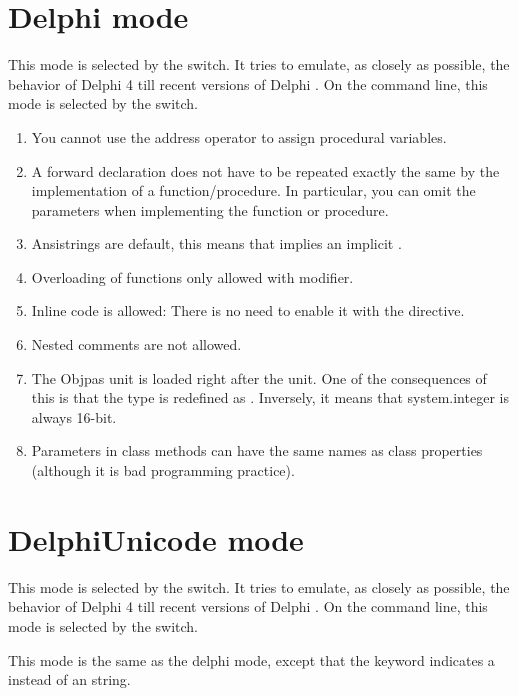 \section{Delphi mode}
This mode is selected by the  switch. It tries to emulate,
as closely as possible, the behavior of Delphi 4 till recent versions of Delphi . 
On the command line, this mode is selected by the  switch.
\begin{enumerate}
\item You cannot use the address operator to assign procedural variables.
\item A forward declaration does not have to be repeated exactly the same by the
implementation of a function/procedure. In particular, you can omit the
parameters when implementing the function or procedure.
\item Ansistrings are default, this means that  implies
an implicit .
\item Overloading of functions only allowed with  modifier.
\item Inline code is allowed: There is no need to enable it with the 
directive.
\item Nested comments are not  allowed.
\item The Objpas unit is loaded right after the  unit. One of the
consequences of this is that the type  is redefined as
. Inversely, it means that system.integer is always 16-bit.
\item Parameters in class methods can have the same names as class
properties (although it is bad programming practice).
\end{enumerate}

\section{DelphiUnicode mode}
This mode is selected by the  switch. It tries to emulate,
as closely as possible, the behavior of Delphi 4 till recent versions of Delphi . 
On the command line, this mode is selected by the  switch.

This mode is the same as the delphi mode, except that the 
keyword indicates a  instead of an 
string.

